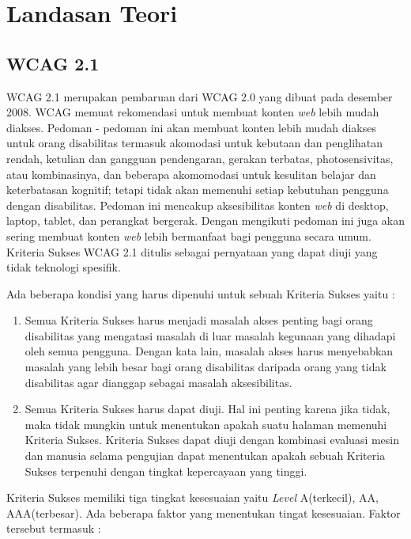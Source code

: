 \chapter{Landasan Teori}
\label{chap:teori}


\section{WCAG 2.1}
\label{sec:WCAG2.1} 
WCAG 2.1 merupakan pembaruan dari WCAG 2.0 yang dibuat pada desember 2008. WCAG memuat rekomendasi untuk membuat konten \textit{web} lebih mudah diakses. Pedoman - pedoman ini akan membuat konten lebih mudah diakses untuk orang disabilitas termasuk akomodasi untuk kebutaan dan penglihatan rendah, ketulian dan gangguan pendengaran, gerakan terbatas, photosensivitas, atau kombinasinya, dan beberapa akomomodasi untuk kesulitan belajar dan keterbatasan kognitif; tetapi tidak akan memenuhi setiap kebutuhan pengguna dengan disabilitas. Pedoman ini mencakup aksesibilitas konten \textit{web} di desktop, laptop, tablet, dan perangkat bergerak. Dengan mengikuti pedoman ini juga akan sering membuat konten \textit{web} lebih bermanfaat bagi pengguna secara umum. Kriteria Sukses WCAG 2.1 ditulis sebagai pernyataan yang dapat diuji yang tidak teknologi spesifik.

Ada beberapa kondisi yang harus dipenuhi untuk sebuah Kriteria Sukses yaitu :

\begin{enumerate}
	\item Semua Kriteria Sukses harus menjadi masalah akses penting bagi orang disabilitas yang mengatasi masalah di luar masalah kegunaan yang dihadapi oleh semua pengguna. Dengan kata lain, masalah akses harus menyebabkan masalah yang lebih besar bagi orang disabilitas daripada orang yang tidak disabilitas agar dianggap sebagai masalah aksesibilitas.
	\item Semua Kriteria Sukses harus dapat diuji. Hal ini penting karena jika tidak, maka tidak mungkin untuk menentukan apakah suatu halaman memenuhi Kriteria Sukses. Kriteria Sukses dapat diuji dengan kombinasi evaluasi mesin dan manusia selama pengujian dapat menentukan apakah sebuah Kriteria Sukses terpenuhi dengan tingkat kepercayaan yang tinggi.
\end{enumerate}

Kriteria Sukses memiliki tiga tingkat kesesuaian yaitu \textit{Level} A(terkecil), AA, AAA(terbesar). Ada beberapa faktor yang menentukan tingat kesesuaian. Faktor tersebut termasuk :

